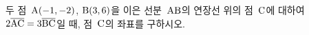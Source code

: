 두 점~$\mathrm{A}(-1{,}\mkern3mu\mathopen{}-2)$, $\mathrm{B}(3{,}\mkern3mu\mathopen{}6)$을 이은 선분~$\mathrm{AB}$의 연장선 위의 점~$\mathrm{C}$에 대하여 $2\overline{\mathrm{AC}}=3\overline{\mathrm{BC}}$일 때, 점~$\mathrm{C}$의 좌표를 구하시오.

